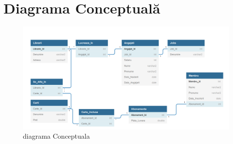 \documentclass[12pt]{article}
\begin{document}
\section{Diagrama Conceptuală}
\begin{figure}[!htb]
	\includegraphics[max width=\linewidth]{imgs/diagConceptuala.png}
	\caption{diagrama Conceptuala}
	\label{fig:Conceptuala}
\end{figure}
\end{document}
